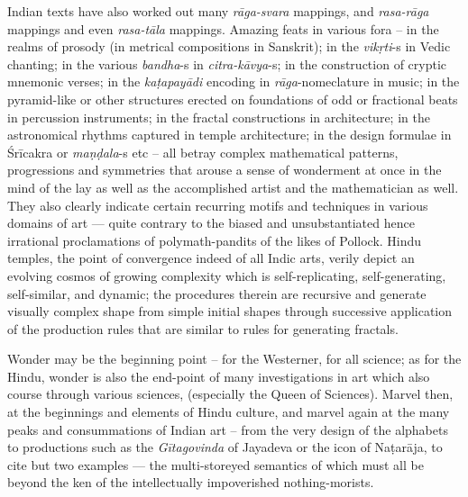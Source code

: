 Indian texts have also worked out many \textsl{rāga-svara} mappings, and \textsl{rasa-rāga} mappings and even \textsl{rasa-tāla} mappings. Amazing feats in various fora -- in the realms of prosody (in metrical compositions in Sanskrit); in the \textsl{vikṛti}-s in Vedic chanting; in the various \textsl{bandha}-s in \textsl{citra-kāvya}-s; in the construction of cryptic mnemonic verses; in the \textsl{kaṭapayādi} encoding in \textsl{rāga}-nomeclature in music; in the pyramid-like or other structures erected on foundations of odd or fractional beats in percussion instruments; in the fractal constructions in architecture; in the  astronomical rhythms captured in temple architecture; in the design formulae in Śrīcakra or \textsl{maṇḍala}-s etc -- all betray complex mathematical patterns, progressions and symmetries that arouse a sense of wonderment at once in the mind of the lay as well as the accomplished artist and the mathematician as well. They also clearly indicate certain recurring motifs and techniques in various domains of art --- quite contrary to the biased and unsubstantiated hence irrational proclamations of polymath-pandits of the likes of Pollock. Hindu temples, the point of convergence indeed of all Indic arts, verily depict an evolving cosmos of growing complexity which is self-replicating, self-generating, self-similar, and dynamic; the procedures therein are recursive and generate visually complex shape from simple initial shapes through successive application of the production rules that are similar to rules for generating fractals.

Wonder may be the beginning point -- for the Westerner, for all science; as for the Hindu, wonder is also the end-point of many investigations in art which also course through various sciences, (especially the Queen of Sciences). Marvel then, at the beginnings and elements of Hindu culture, and marvel again at the many peaks and consummations of Indian art – from the very design of the alphabets to productions such as the \textsl{Gītagovinda} of Jayadeva or the icon of Naṭarāja, to cite but two examples --- the multi-storeyed semantics of which must all be beyond the ken of the intellectually impoverished nothing-morists.

